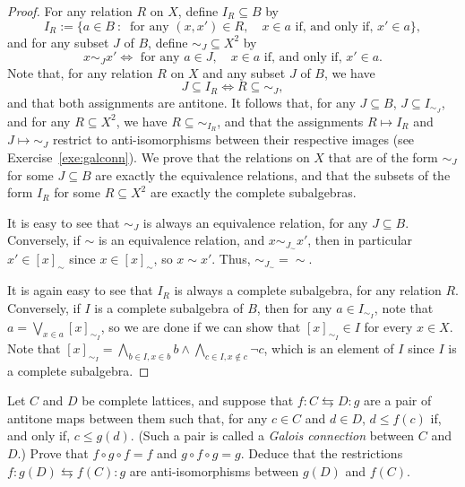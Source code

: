\begin{proof}
  For any relation $R$ on $X$, define $I_R \subseteq B$ by
  \[ I_R := \{ a \in B \ \colon \ \text{ for any } (x,x') \in R, \quad x \in a \text{ if, and only if, } x' \in a \},\]
  and for any subset $J$ of $B$, define ${\sim_J} \subseteq X^2$ by
  \[ x \sim_J x' \iff \text{ for any } a \in J, \quad x \in a \text{ if, and only if, } x' \in a.\]
  Note that, for any relation $R$ on $X$ and any subset $J$ of $B$, we have
  \[ J \subseteq I_R \iff R \subseteq {\sim_J},\]
and that both assignments are antitone.
  It follows that, for any $J \subseteq B$, $J \subseteq I_{\sim_J}$, and for any $R \subseteq X^2$, we have $R \subseteq {\sim_{I_R}}$, and that the assignments $R \mapsto I_R$ and $J \mapsto {\sim_J}$ restrict to anti-isomorphisms between their respective  images (see Exercise~\ref{exe:galconn}). We prove that the relations on $X$ that are of the form $\sim_J$ for some $J \subseteq B$ are exactly the equivalence relations, and that the subsets of the form $I_R$ for some $R \subseteq X^2$ are exactly the complete subalgebras.

  It is easy to see that $\sim_J$ is always an equivalence relation, for any $J \subseteq B$. Conversely, if $\sim$ is an equivalence relation, and $x \sim_{J_\sim} x'$, then in particular $x' \in [x]_{\sim}$ since $x \in [x]_\sim$, so $x {\sim} x'$. Thus, $\sim_{J_\sim} = {\sim}$. 

  It is again easy to see that $I_R$ is always a complete subalgebra, for any relation $R$. Conversely, if $I$ is a complete subalgebra of $B$, then for any $a \in I_{\sim_I}$, note that $a = \bigvee_{x \in a} [x]_{\sim_I}$, so we are done if we can show that $[x]_{\sim_I} \in I$ for every $x \in X$. Note that $[x]_{\sim_I} = \bigwedge_{b \in I, x \in b} b \wedge \bigwedge_{c \in I, x \not\in c} \neg c$, which is an element of $I$ since $I$ is a complete subalgebra.
\end{proof}
\begin{exercise}\label{exe:galconn}\easy
  Let $C$ and $D$ be complete lattices, and suppose that $f \colon C \leftrightarrows D \colon g$ are a pair of antitone maps between them such that, for any $c \in C$ and $d \in D$, $d \leq f(c)$ if, and only if, $c \leq g(d)$. (Such a pair is called a \emph{Galois connection} between $C$ and $D$.) Prove that $f\circ g \circ f = f$ and $g \circ f \circ g = g$. Deduce that the restrictions $f \colon g(D) \leftrightarrows f(C) \colon g$ are anti-isomorphisms between $g(D)$ and $f(C)$.
\end{exercise}


